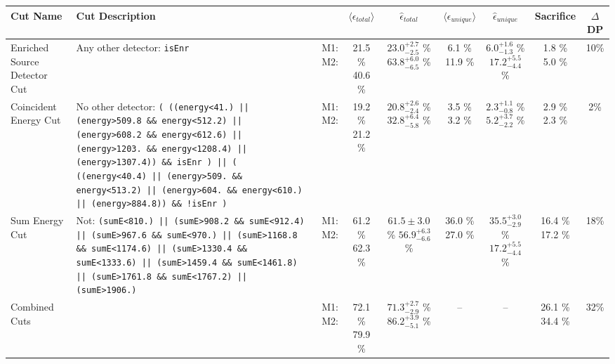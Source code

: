 \small
\begin{tabular}{|>{\raggedright}m{3cm}|m{6cm}|c c c|c c|c|c|}
\hline
  Cut Name & Cut Description &   & $\langle\epsilon_{total}\rangle$ & $\hat{\epsilon}_{total}$ & $\langle\epsilon_{unique}\rangle$ & $\hat{\epsilon}_{unique}$ & Sacrifice & $\Delta$DP \\
\hline
  Enriched Source Detector Cut & \tiny Any other detector: \texttt{isEnr} & \makecell{M1: \\ M2:} & \makecell{21.5 \% \\ 40.6 \%} & \makecell{$23.0^{+2.7}_{-2.5}$ \% \\ $63.8^{+6.0}_{-6.5}$ \%} & \makecell{6.1 \% \\ 11.9 \%} & \makecell{$6.0^{+1.6}_{-1.3}$ \% \\ $17.2^{+5.5}_{-4.4}$ \%} & \makecell{1.8 \% \\ 5.0 \%} & 10\% \\
  Coincident Energy Cut & \tiny No other detector: \texttt{( ((energy<41.) || (energy>509.8 \&\& energy<512.2) || (energy>608.2 \&\& energy<612.6) || (energy>1203. \&\& energy<1208.4) || (energy>1307.4)) \&\& isEnr ) || ( ((energy<40.4) || (energy>509. \&\& energy<513.2) || (energy>604. \&\& energy<610.) || (energy>884.8)) \&\& !isEnr )} & \makecell{M1: \\ M2:} & \makecell{19.2 \% \\ 21.2 \%} & \makecell{$20.8^{+2.6}_{-2.4}$ \% \\ $32.8^{+6.4}_{-5.8}$ \%} & \makecell{3.5 \% \\ 3.2 \%} & \makecell{$2.3^{+1.1}_{-0.8}$ \% \\ $5.2^{+3.7}_{-2.2}$ \%} & \makecell{2.9 \% \\ 2.3 \%} & 2\% \\
  Sum Energy Cut & \tiny Not:  \texttt{(sumE<810.) || (sumE>908.2 \&\& sumE<912.4) || (sumE>967.6 \&\& sumE<970.) || (sumE>1168.8 \&\& sumE<1174.6) || (sumE>1330.4 \&\& sumE<1333.6) || (sumE>1459.4 \&\& sumE<1461.8) || (sumE>1761.8 \&\& sumE<1767.2) || (sumE>1906.)} & \makecell{M1: \\ M2:} & \makecell{61.2 \% \\ 62.3 \%} & \makecell{$61.5 \pm 3.0$ \% \\ $56.9^{+6.3}_{-6.6}$ \%} & \makecell{36.0 \% \\ 27.0 \%} & \makecell{$35.5^{+3.0}_{-2.9}$ \% \\ $17.2^{+5.5}_{-4.4}$ \%} & \makecell{16.4 \% \\ 17.2 \%} & 18\% \\
  Combined Cuts &  & \makecell{M1: \\ M2:} & \makecell{72.1 \% \\ 79.9 \%} & \makecell{$71.3^{+2.7}_{-2.9}$ \% \\ $86.2^{+3.9}_{-5.1}$ \%} & -- & -- & \makecell{26.1 \% \\ 34.4 \%} & 32\% \\
\hline
\end{tabular}
